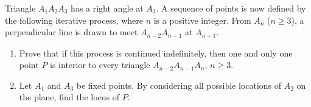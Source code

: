 Triangle $A_1 A_2 A_3$ has a right angle at $A_3$. A sequence of points is now defined by the following iterative process, where $n$ is a positive integer. From $A_n$ ($n \geq 3$), a perpendicular line is drawn to meet $A_{n-2}A_{n-1}$ at $A_{n+1}$.
\begin{enumerate}[label=(\alph*)]
	\item Prove that if this process is continued indefinitely, then one and only one point $P$ is interior to every triangle $A_{n-2} A_{n-1} A_{n}$, $n \geq 3$.
	\item Let $A_1$ and $A_3$ be fixed points. By considering all possible locations of $A_2$ on the plane, find the locus of $P$.
\end{enumerate}